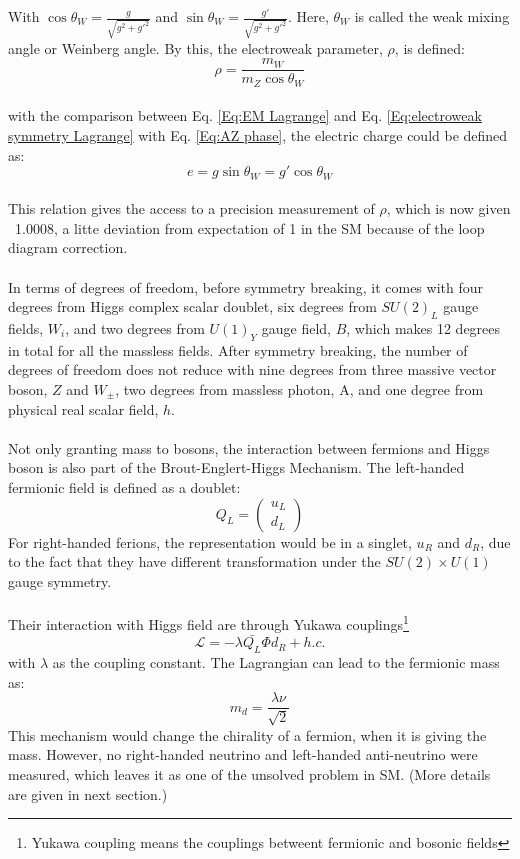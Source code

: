 With $\cos{\theta_W}=\frac{g}{\sqrt{g^2+g'^2}}$ and $\sin{\theta_W}=\frac{g'}{\sqrt{g^2+g'^2}}$. Here, $\theta_W$ is called the weak mixing angle or Weinberg angle. By this, the electroweak parameter, $\rho$, is defined:
\begin{equation}
\label{Eq:rho}
\rho = \frac{m_W}{m_Z\cos{\theta_W}} 
\end{equation}
\\with the comparison between Eq. \ref{Eq:EM Lagrange} and Eq. \ref{Eq:electroweak symmetry Lagrange} with Eq. \ref{Eq:AZ phase}, the electric charge could be defined as:
\begin{equation}
e=g\sin{\theta_W}=g'\cos{\theta_W}
\end{equation}
\\This relation gives the access to a precision measurement of $\rho$, which is now given ~1.0008, a litte deviation from expectation of 1 in the SM because of the loop diagram correction.
\\
\\In terms of degrees of freedom, before symmetry breaking, it comes with four degrees from Higgs complex scalar doublet, six degrees from $SU(2)_L$ gauge fields, $W_i$, and two degrees from $U(1)_Y$ gauge field, $B$, which makes 12 degrees in total for all the massless fields. After symmetry breaking, the number of degrees of freedom does not reduce with nine degrees from three massive vector boson, $Z$ and $W_{\pm}$, two degrees from massless photon, A, and one degree from physical real scalar field, $h$.
\\
\\Not only granting mass to bosons, the interaction between fermions and Higgs boson is also part of the Brout-Englert-Higgs Mechanism. The left-handed fermionic field is defined as a doublet:
\begin{equation}
 Q_L=\left(  \begin{array}{ c } u_L\\  d_L \end{array} \right)
\end{equation}
For right-handed ferions, the representation would be in a singlet, $u_R$ and $d_{R}$, due to the fact that they have different transformation under the $SU(2)\times U(1)$ gauge symmetry.      
\\
\\Their interaction with Higgs field are through Yukawa couplings\footnote{Yukawa coupling means the couplings betweent fermionic and bosonic fields}
\begin{equation}
\mathcal{L} = -\lambda\bar{Q_L}\Phi d_R + h.c. 
\end{equation}
with $\lambda$ as the coupling constant. The Lagrangian can lead to the fermionic mass as:
\begin{equation}
 m_d=\frac{\lambda \nu}{\sqrt{2}}
\end{equation}
This mechanism would change the chirality of a fermion, when it is giving the mass. However, no right-handed neutrino and left-handed anti-neutrino were measured, which leaves it as one of the unsolved problem in SM. (More details are given in next section.)
